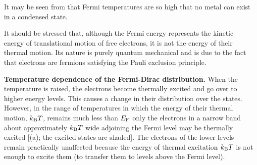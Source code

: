 \begin{table}[!b]
	\renewcommand{\arraystretch}{1.2}
	\caption{}
	\vspace{-0.6cm}
	\label{table:3_2}
	\begin{center}\end{center}
\end{table}

It may be seen from  that Fermi temperatures are so high that no metal can exist in a condensed state.

It should be stressed that, although the Fermi energy represents the kinetic energy of translational motion of free electrons, it is not the energy of their thermal motion. Its nature is purely quantum mechanical and is due to the fact that electrons are fermions satisfying the Pauli exclusion principle.

\textbf{Temperature dependence of the Fermi-Dirac distribution.} When the temperature is raised, the electrons become thermally excited and go over to higher energy levels. This causes a change in their distribution over the states. However, in the range of temperatures in which the energy of their thermal motion, $k_{\text{B}}T$, remains much less than $E_{\text{F}}$ only the electrons in a narrow band about approximately $k_{\text{B}}T$ wide adjoining the Fermi level may be thermally excited [(a); the excited states are shaded]. The electrons of the lower levels remain practically unaffected because the energy of thermal excitation $k_{\text{B}}T$ is not enough to excite them (to transfer them to
levels above the Fermi level).

